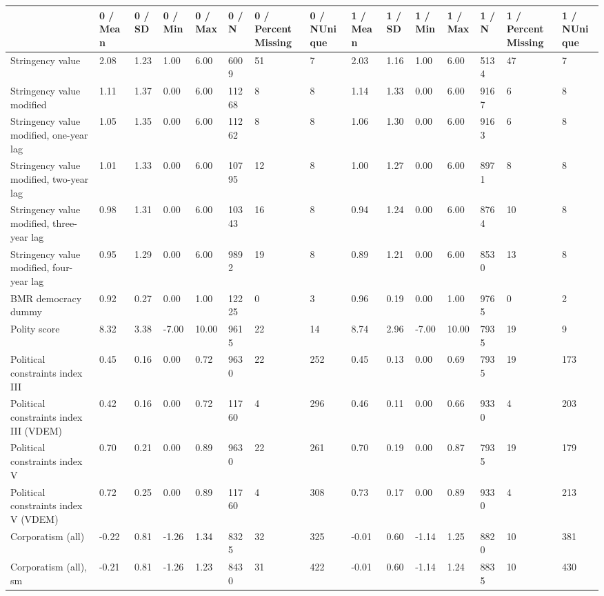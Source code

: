 
\begin{longtable}{lllllllllllllll}
\toprule
  & 0 / Mean & 0 / SD & 0 / Min & 0 / Max & 0 / N & 0 / PercentMissing & 0 / NUnique & 1 / Mean & 1 / SD & 1 / Min & 1 / Max & 1 / N & 1 / PercentMissing & 1 / NUnique\\
\midrule
Stringency value & 2.08 & 1.23 & 1.00 & 6.00 & 6009 & 51 & 7 & 2.03 & 1.16 & 1.00 & 6.00 & 5134 & 47 & 7\\
Stringency value modified & 1.11 & 1.37 & 0.00 & 6.00 & 11268 & 8 & 8 & 1.14 & 1.33 & 0.00 & 6.00 & 9167 & 6 & 8\\
Stringency value modified, one-year lag & 1.05 & 1.35 & 0.00 & 6.00 & 11262 & 8 & 8 & 1.06 & 1.30 & 0.00 & 6.00 & 9163 & 6 & 8\\
Stringency value modified, two-year lag & 1.01 & 1.33 & 0.00 & 6.00 & 10795 & 12 & 8 & 1.00 & 1.27 & 0.00 & 6.00 & 8971 & 8 & 8\\
Stringency value modified, three-year lag & 0.98 & 1.31 & 0.00 & 6.00 & 10343 & 16 & 8 & 0.94 & 1.24 & 0.00 & 6.00 & 8764 & 10 & 8\\
\addlinespace
Stringency value modified, four-year lag & 0.95 & 1.29 & 0.00 & 6.00 & 9892 & 19 & 8 & 0.89 & 1.21 & 0.00 & 6.00 & 8530 & 13 & 8\\
BMR democracy dummy & 0.92 & 0.27 & 0.00 & 1.00 & 12225 & 0 & 3 & 0.96 & 0.19 & 0.00 & 1.00 & 9765 & 0 & 2\\
Polity score & 8.32 & 3.38 & -7.00 & 10.00 & 9615 & 22 & 14 & 8.74 & 2.96 & -7.00 & 10.00 & 7935 & 19 & 9\\
Political constraints index III & 0.45 & 0.16 & 0.00 & 0.72 & 9630 & 22 & 252 & 0.45 & 0.13 & 0.00 & 0.69 & 7935 & 19 & 173\\
Political constraints index III (VDEM) & 0.42 & 0.16 & 0.00 & 0.72 & 11760 & 4 & 296 & 0.46 & 0.11 & 0.00 & 0.66 & 9330 & 4 & 203\\
\addlinespace
Political constraints index V & 0.70 & 0.21 & 0.00 & 0.89 & 9630 & 22 & 261 & 0.70 & 0.19 & 0.00 & 0.87 & 7935 & 19 & 179\\
Political constraints index V (VDEM) & 0.72 & 0.25 & 0.00 & 0.89 & 11760 & 4 & 308 & 0.73 & 0.17 & 0.00 & 0.89 & 9330 & 4 & 213\\
Corporatism (all) & -0.22 & 0.81 & -1.26 & 1.34 & 8325 & 32 & 325 & -0.01 & 0.60 & -1.14 & 1.25 & 8820 & 10 & 381\\
Corporatism (all), sm & -0.21 & 0.81 & -1.26 & 1.23 & 8430 & 31 & 422 & -0.01 & 0.60 & -1.14 & 1.24 & 8835 & 10 & 430\\

\end{longtable}
